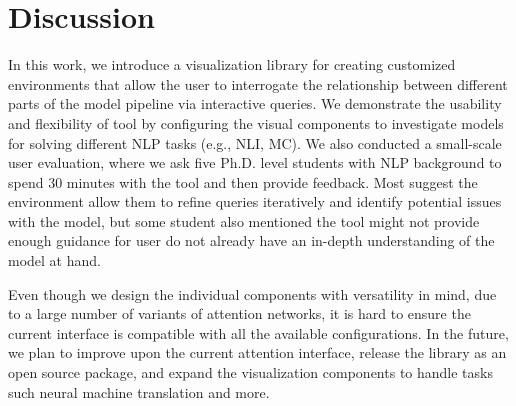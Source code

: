\section{Discussion}
In this work, we introduce a visualization library for creating customized environments that allow the user to interrogate the relationship between different parts of the model pipeline via interactive queries.
%
We demonstrate the usability and flexibility of tool by configuring the visual components to investigate models for solving different NLP tasks (e.g., NLI, MC).
%
We also conducted a small-scale user evaluation, where we ask five Ph.D. level students with NLP background to spend 30 minutes with the tool and then provide feedback. Most suggest the environment allow them to refine queries iteratively and identify potential issues with the model, but some student also mentioned the tool might not provide enough guidance for user do not already have an in-depth understanding of the model at hand.

Even though we design the individual components with versatility in mind, due to a large number of variants of attention networks, it is hard to ensure the current interface is compatible with all the available configurations.
%
In the future, we plan to improve upon the current attention interface, release the library as an open source package, and expand the visualization components to handle tasks such neural machine translation and more. 
